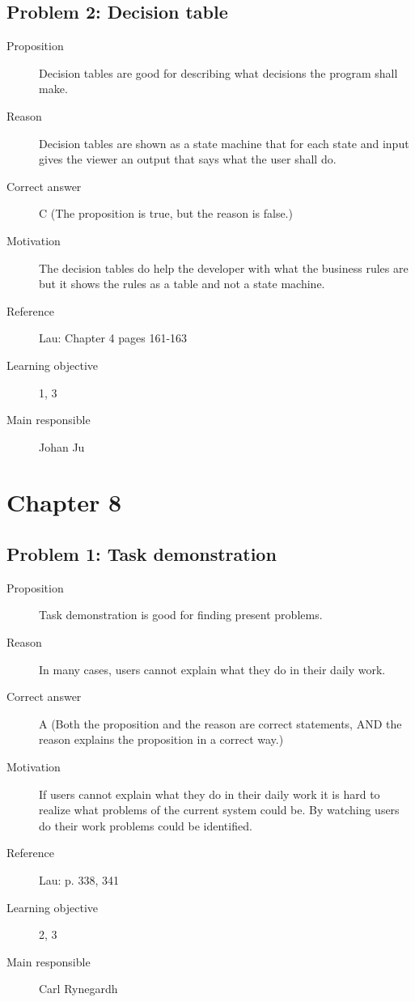\documentclass[10pt,a4paper]{article}
\begin{document}
\subsection*{Problem 2: Decision table}
\begin{description}
\item[Proposition] Decision tables are good for describing what decisions the program shall make.
\item[Reason] Decision tables are shown as a state machine that for each state and input gives the viewer an output that says what the user shall do.
\item[Correct answer] C (The proposition is true, but the reason is false.)
\item[Motivation] The decision tables do help the developer with what the business rules are but it shows the rules as a table and not a state machine.
\item[Reference] Lau: Chapter 4 pages 161-163
\item[Learning objective] 1, 3
\item[Main responsible] Johan Ju
\end{description}

\section*{Chapter 8}
\subsection*{Problem 1: Task demonstration}
\begin{description}
\item[Proposition] Task demonstration is good for finding present problems.
\item[Reason] In many cases, users cannot explain what they do in their daily work.
\item[Correct answer] A (Both the proposition and the reason are correct statements, AND the reason explains the proposition in a correct way.)
\item[Motivation] If users cannot explain what they do in their daily work it is hard to realize what problems of the current system could be. By watching users do their work problems could be identified.
\item[Reference] Lau: p. 338, 341
\item[Learning objective] 2, 3
\item[Main responsible] Carl Rynegardh
\end{description}
\end{document}

